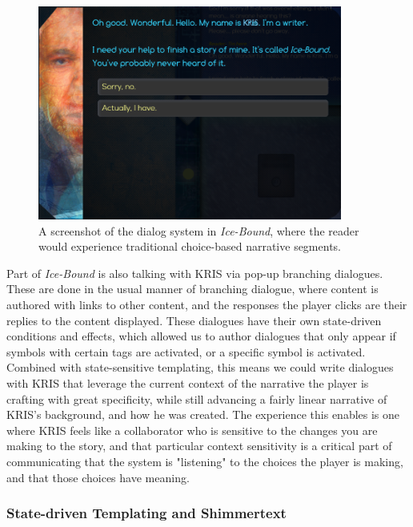 
\begin{figure}
    \centering
    \includegraphics[width=10cm]{figures/2-Ice-Bound/kris-dialogue.png}
    \caption{A screenshot of the dialog system in \textit{Ice-Bound}, where the reader would experience traditional choice-based narrative segments.}
    \label{fig:kris}
\end{figure}



Part of \textit{Ice-Bound} is also talking with KRIS via pop-up branching dialogues. These are done in the usual manner of branching dialogue, where content is authored with links to other content, and the responses the player clicks are their replies to the content displayed. These dialogues have their own state-driven conditions and effects, which allowed us to author dialogues that only appear if symbols with certain tags are activated, or a specific symbol is activated. Combined with state-sensitive templating, this means we could write dialogues with KRIS that leverage the current context of the narrative the player is crafting with great specificity, while still advancing a fairly linear narrative of KRIS's background, and how he was created. The experience this enables is one where KRIS feels like a collaborator who is sensitive to the changes you are making to the story, and that particular context sensitivity is a critical part of communicating that the system is "listening" to the choices the player is making, and that those choices have meaning.

\subsubsection{State-driven Templating and Shimmertext}\label{subsubsec:state-driven-templating-and-shimmertext}


